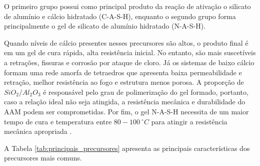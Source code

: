 O primeiro grupo possui como principal produto da reação de ativação o silicato de alumínio e cálcio hidratado (C-A-S-H), enquanto o segundo grupo forma principalmente o gel de silicato de alumínio hidratado (N-A-S-H).

Quando níveis de cálcio presentes nesses precursores são altos, o produto final é em um gel de cura rápida, alta resistência inicial. No entanto, são mais suscetíveis a retrações, fissuras e corrosão por ataque de cloro.
Já os sistemas de baixo cálcio formam uma rede amorfa de tetraedros que apresenta baixa permeabilidade e retração, melhor resistência ao fogo e estrutura menos porosa.
A proporção de $SiO_2/Al_2O_3$ é responsável pelo grau de polimerização do gel formado, portanto, caso a relação ideal não seja atingida, a resistência mecânica e durabilidade do AAM podem ser comprometidas.
Por fim, o gel N-A-S-H necessita de um maior tempo de cura e temperatura entre $80-100\ ^\circ C$ para atingir a resistência mecânica apropriada \cite{Nodehi2021}.

A Tabela \ref{tab:principais_precursores} apresenta as principais características dos precursores mais comuns.

